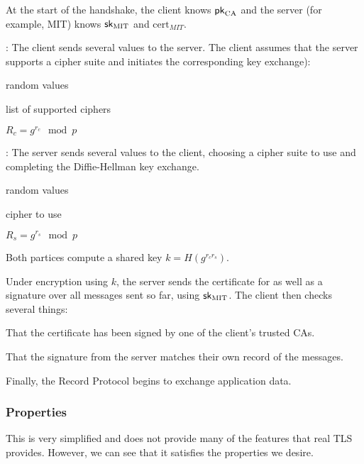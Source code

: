 \begin{compactenum}
\item At the start of the handshake, the client knows $\mathsf{pk}_{\text{CA}}$ and the server (for example, MIT) knows ${\mathsf{sk}}_\text{MIT}$ and $\text{cert}_{MIT}$.
\item {}: The client sends several values to the server. The client assumes that the server supports a cipher suite and initiates the corresponding key exchange):
	\begin{compactitem}
		\item random values
		\item list of supported ciphers
		\item $R_c = g^{r_c} \mod p$
	\end{compactitem}
\item {}: The server sends several values to the client, choosing a cipher suite to use and completing the Diffie-Hellman key exchange. 
	\begin{compactitem}
		\item random values
		\item cipher to use
		\item $R_s = g^{r_s} \mod p$
	\end{compactitem}
\item Both partices compute a shared key $k = H(g^{r_c r_s})$.
\item Under encryption using $k$, the server sends the certificate for  as well as a signature over all messages sent so far, using ${\mathsf{sk}}_\text{MIT}$. The client then checks several things:
	\begin{compactitem}
	\item That the certificate has been signed by one of the client's trusted CAs.
	\item That the signature from the server matches their own record of the messages.
	\end{compactitem}
\item Finally, the Record Protocol begins to exchange application data.
\end{compactenum}

\subsubsection{Properties}
This is very simplified and does not provide many of the features that real TLS provides. However, we can see that it satisfies the properties we desire. 

